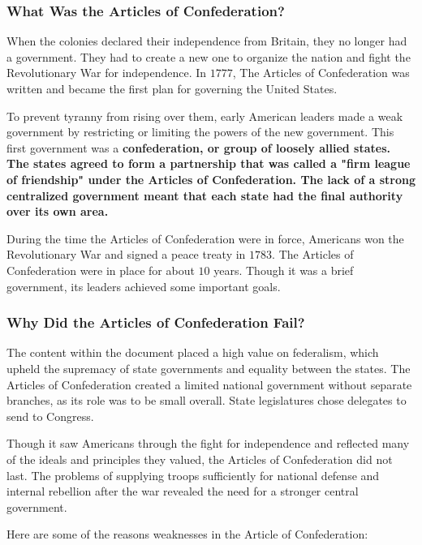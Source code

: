 
\subsubsection*{What Was the Articles of Confederation?}

When the colonies declared their independence from Britain, they no longer had
a government. They had to create a new one to organize the nation and fight the
Revolutionary War for independence. In $1777$, The Articles of Confederation
was written and became the first plan for governing the United States.

To prevent tyranny from rising over them, early American leaders made a weak
government by restricting or limiting the powers of the new government. This
first government was a \bf{confederation}, or group of loosely allied
states. The states agreed to form a partnership that was called a \bf{"firm
league of friendship"} under the \bf{Articles of Confederation}. The lack
of a strong centralized government meant that each state had the final
authority over its own area.

During the time the Articles of Confederation were in force, Americans won the
Revolutionary War and signed a peace treaty in $1783$. The Articles of
Confederation were in place for about $10$ years. Though it was a brief
government, its leaders achieved some important goals. 

\subsubsection*{Why Did the Articles of Confederation Fail?}

The content within the document placed a high value on federalism, which upheld
the supremacy of state governments and equality between the states. The
Articles of Confederation created a limited national government without
separate branches, as its role was to be small overall. State legislatures
chose delegates to send to Congress.

Though it saw Americans through the fight for independence and reflected many
of the ideals and principles they valued, the Articles of Confederation did not
last. The problems of supplying troops sufficiently for national defense and
internal rebellion after the war revealed the need for a stronger central
government.

Here are some of the reasons weaknesses in the Article of Confederation:

